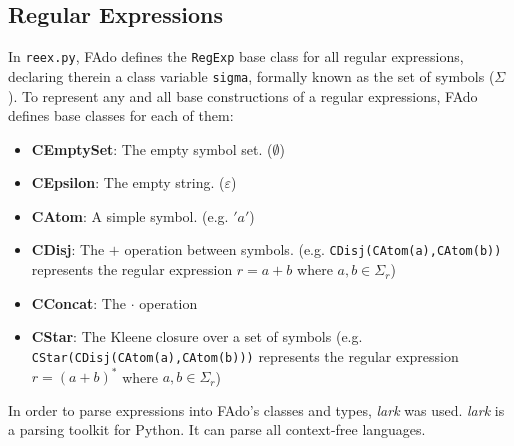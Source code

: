 \subsection{Regular Expressions}
In \texttt{reex.py}, FAdo defines the \texttt{RegExp} base class for all regular expressions, declaring therein a class variable \texttt{sigma}, formally known as the set of symbols ($\Sigma$).
To represent any and all base constructions of a regular expressions, FAdo defines base classes for each of them:
\begin{itemize}
    \item \textbf{CEmptySet}: The empty symbol set. ($\emptyset$)
    \item \textbf{CEpsilon}: The empty string. ($\varepsilon$)
    \item \textbf{CAtom}: A simple symbol. (e.g. $'a'$)
    \item \textbf{CDisj}: The $+$ operation between symbols. (e.g. \texttt{CDisj(CAtom(a),CAtom(b))} represents the regular expression $r=a+b$ where $a,b \in \Sigma_r$)
    \item \textbf{CConcat}: The $\cdot$ operation 
    \item \textbf{CStar}: The Kleene closure over a set of symbols (e.g. \texttt{CStar(CDisj(CAtom(a),CAtom(b)))} represents the regular expression $r=(a+b)^*$ where $a,b \in \Sigma_r$)

\end{itemize}

In order to parse expressions into FAdo's classes and types, \emph{lark} was used. \emph{lark} is a parsing toolkit for Python. It can parse all context-free languages.



